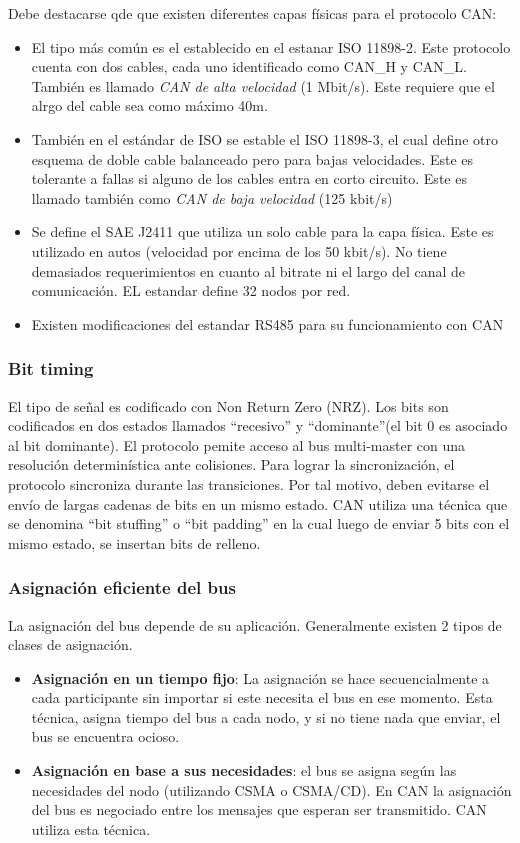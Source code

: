 Debe destacarse qde que existen diferentes capas físicas para el protocolo CAN:
\begin{itemize}
\item El tipo más común es el establecido en el estanar ISO 11898-2. Este protocolo cuenta con dos cables, cada uno identificado como CAN\_H y CAN\_L. También es llamado \textit{CAN de alta velocidad} (1 Mbit/s). Este requiere que el alrgo del cable sea como máximo 40m. 
\item También en el estándar de ISO se estable el ISO 11898-3, el cual define otro esquema de doble cable balanceado pero para bajas velocidades. Este es tolerante a fallas si alguno de los cables entra en corto circuito. Este es llamado también como \textit{CAN de baja velocidad} (125 kbit/s)
\item Se define el SAE J2411 que utiliza un solo cable para la capa física. Este es utilizado en autos (velocidad por encima de los 50 kbit/s). No tiene demasiados requerimientos en cuanto al bitrate ni el largo del canal de comunicación. EL estandar define 32 nodos por red. 
\item Existen modificaciones del estandar RS485 para su funcionamiento con CAN
\end{itemize}

\subsubsection{Bit timing}
El tipo de señal es codificado con Non Return Zero (NRZ). Los bits son codificados en dos estados llamados ``recesivo'' y ``dominante''(el bit 0 es asociado al bit dominante). El protocolo pemite acceso al bus multi-master con una resolución determinística ante colisiones. Para lograr la sincronización, el protocolo sincroniza durante las transiciones. Por tal motivo, deben evitarse el envío de largas cadenas de bits en un mismo estado. CAN utiliza una técnica que se denomina ``bit stuffing'' o ``bit padding'' en la cual luego de enviar 5 bits con el mismo estado, se insertan bits de relleno.

\subsubsection{Asignación eficiente del bus}
La asignación del bus depende de su aplicación. Generalmente existen 2 tipos de clases de asignación.

\begin{itemize}
\item \textbf{Asignación en un tiempo fijo}: La asignación se hace secuencialmente a cada participante sin importar si este necesita el bus en ese momento. Esta técnica, asigna tiempo del bus a cada nodo, y si no tiene nada que enviar, el bus se encuentra ocioso.
  
\item \textbf{Asignación en base a sus necesidades}: el bus se asigna según las necesidades del nodo (utilizando CSMA o CSMA/CD). En CAN la asignación del bus es negociado entre los mensajes que esperan ser transmitido. CAN utiliza esta técnica. 
\end{itemize}
